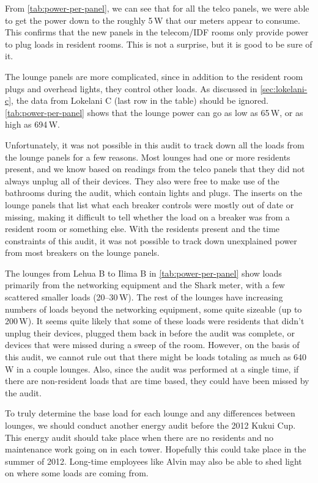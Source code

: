 \documentclass[11pt,final]{article}
\newcommand{\W}{\,W\xspace}
\begin{document}
From \autoref{tab:power-per-panel}, we can see that for all the telco panels, we were able to get the power down to the roughly 5\W that our meters appear to consume. This confirms that the new panels in the telecom/IDF rooms only provide power to plug loads in resident rooms. This is not a surprise, but it is good to be sure of it.

The lounge panels are more complicated, since in addition to the resident room plugs and overhead lights, they control other loads. As discussed in \autoref{sec:lokelani-c}, the data from Lokelani C (last row in the table) should be ignored. \autoref{tab:power-per-panel} shows that the lounge power can go as low as 65\W, or as high as 694\W.

Unfortunately, it was not possible in this audit to track down all the loads from the lounge panels for a few reasons. Most lounges had one or more residents present, and we know based on readings from the telco panels that they did not always unplug all of their devices. They also were free to make use of the bathrooms during the audit, which contain lights and plugs. The inserts on the lounge panels that list what each breaker controls were mostly out of date or missing, making it difficult to tell whether the load on a breaker was from a resident room or something else. With the residents present and the time constraints of this audit, it was not possible to track down unexplained power from most breakers on the lounge panels.

The lounges from Lehua B to Ilima B in \autoref{tab:power-per-panel} show loads primarily from the networking equipment and the Shark meter, with a few scattered smaller loads (20--30\W). The rest of the lounges have increasing numbers of loads beyond the networking equipment, some quite sizeable (up to 200\W). It seems quite likely that some of these loads were residents that didn't unplug their devices, plugged them back in before the audit was complete, or devices that were missed during a sweep of the room. However, on the basis of this audit, we cannot rule out that there might be loads totaling as much as 640\W in a couple lounges. Also, since the audit was performed at a single time, if there are non-resident loads that are time based, they could have been missed by the audit.

To truly determine the base load for each lounge and any differences between lounges, we should conduct another energy audit before the 2012 Kukui Cup. This energy audit should take place when there are no residents and no maintenance work going on in each tower. Hopefully this could take place in the summer of 2012. Long-time employees like Alvin may also be able to shed light on where some loads are coming from.
\end{document}

